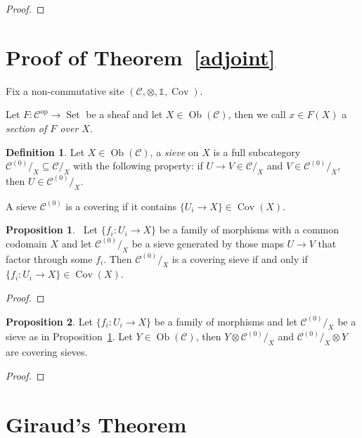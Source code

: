 \documentclass[8pt]{article}
\theoremstyle{definition}
\newtheorem{definition}{Definition}[section]
\theoremstyle{definition}
\theoremstyle{definition}
\theoremstyle{definition}
\theoremstyle{definition}
\theoremstyle{definition}
\theoremstyle{definition}
\newtheorem{prop}{Proposition}[section]
\theoremstyle{definition}
\theoremstyle{definition}
\theoremstyle{definition}
\theoremstyle{definition}
\theoremstyle{definition}
\theoremstyle{definition}
\theoremstyle{question}
\newcommand{\Ob}[1]{\operatorname{Ob}({\mathcal{#1}})}
\begin{document}
\begin{proof}

\end{proof}

\section{Proof of Theorem~\ref{adjoint}}

  Fix a non-commutative site $(\mathcal{C}, \otimes, \mathds{1}, \operatorname{Cov})$.

  Let $F : \mathcal{C}^{\operatorname{op}} \to \operatorname{Set}$ be a sheaf and let 
  $X \in \Ob{C}$, then we call $x \in F(X)$
  a \emph{section of $F$ over $X$}.

\begin{definition}
  Let $X \in \Ob{C}$, a \emph{sieve} on $X$ is a full subcategory 
  $\mathcal{C}^{(0)}/_X \subseteq \mathcal{C}/_X$ with the following property:
  if $U \to V \in \mathcal{C}/_X$ and $V \in \mathcal{C}^{(0)}/_X$, then $U \in \mathcal{C}^{(0)}/_X$.

  A sieve $\mathcal{C}^{(0)}$ is a covering if it contains $\{ U_i \to X \} \in \operatorname{Cov}(X)$.
\end{definition}

\begin{prop}~\label{covering:sieve:prop1}
  Let $\{ f_i : U_i \to X \}$ be a family of morphisms with a common codomain $X$
  and let $\mathcal{C}^{(0)}/_X$ be a sieve generated by those maps $U \to V$ that factor through some $f_i$.
  Then $\mathcal{C}^{(0)}/_X$ is a covering sieve if and only if $\{ f_i : U_i \to X \} \in \operatorname{Cov}(X)$.
\end{prop}

\begin{proof}

\end{proof}

\begin{prop}
  Let $\{ f_i : U_i \to X \}$ be a family of morphisms and let $\mathcal{C}^{(0)}/_X$ be a sieve
  as in Proposition~\ref{covering:sieve:prop1}. Let $Y \in \Ob{C}$, then
  $Y \otimes {\mathcal{C}^{(0)}/_X}$ and ${\mathcal{C}^{(0)}/_X} \otimes Y$ are covering sieves.
\end{prop}

\begin{proof}

\end{proof}

\section{Giraud's Theorem}
\end{document}
